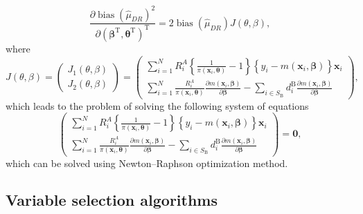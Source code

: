 \documentclass[
]{jss}
\begin{document}
\begin{equation*}
\frac{\partial \operatorname{bias}\left(\hat{\mu}_{D R}\right)^2}{\partial\left(\boldsymbol{\beta}^{\mathrm{T}}, \boldsymbol{\theta}^{\mathrm{T}}\right)^{\mathrm{T}}}=2 \operatorname{bias}\left(\hat{\mu}_{D R}\right) J(\theta, \beta),
\end{equation*} where \begin{equation*}
J(\theta, \beta)=\left(\begin{array}{l}
J_1(\theta, \beta) \\
J_2(\theta, \beta)
\end{array}\right)=\left(\begin{array}{c}
\sum_{i=1}^N R_i^A\left\{\frac{1}{\pi\left(\boldsymbol{x}_i, \boldsymbol{\theta}\right)}-1\right\}\left\{y_i-m\left(\boldsymbol{x}_i, \boldsymbol{\beta}\right)\right\} \boldsymbol{x}_i \\
\sum_{i=1}^N \frac{R_i^A}{\pi\left(\boldsymbol{x}_i, \boldsymbol{\theta}\right)} \frac{\partial m\left(\boldsymbol{x}_i, \boldsymbol{\beta}\right)}{\partial \boldsymbol{\beta}}-\sum_{i \in S_{\mathrm{B}}} d_i^{\mathrm{B}} \frac{\partial m\left(\boldsymbol{x}_i, \boldsymbol{\beta}\right)}{\partial \boldsymbol{\beta}}
\end{array}\right),
\end{equation*} which leads to the problem of solving the following
system of equations \begin{equation}
\label{bias-min}
    \left(\begin{array}{c}
\sum_{i=1}^N R_i^A\left\{\frac{1}{\pi\left(\boldsymbol{x}_i, \boldsymbol{\theta}\right)}-1\right\}\left\{y_i-m\left(\boldsymbol{x}_i, \boldsymbol{\beta}\right)\right\} \boldsymbol{x}_i \\
\sum_{i=1}^N \frac{R_i^A}{\pi\left(\boldsymbol{x}_i, \boldsymbol{\theta}\right)} \frac{\partial m\left(\boldsymbol{x}_i, \boldsymbol{\beta}\right)}{\partial \boldsymbol{\beta}}-\sum_{i \in S_{\mathrm{B}}} d_i^{\mathrm{B}} \frac{\partial m\left(\boldsymbol{x}_i, \boldsymbol{\beta}\right)}{\partial \boldsymbol{\beta}}
\end{array}\right) = \boldsymbol{0},
\end{equation} which can be solved using Newton--Raphson optimization
method.

\subsection{Variable selection algorithms}\label{sec-varsel}
\end{document}
